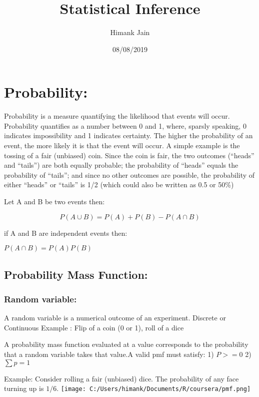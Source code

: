 \documentclass[]{article}
\title{Statistical Inference}
\author{Himank Jain}
\date{08/08/2019}
\begin{document}
\maketitle

\hypertarget{probability}{%
\section{Probability:}\label{probability}}

Probability is a measure quantifying the likelihood that events will
occur. Probability quantifies as a number between 0 and 1, where,
sparsly speaking, 0 indicates impossibility and 1 indicates certainty.
The higher the probability of an event, the more likely it is that the
event will occur. A simple example is the tossing of a fair (unbiased)
coin. Since the coin is fair, the two outcomes (``heads'' and ``tails'')
are both equally probable; the probability of ``heads'' equals the
probability of ``tails''; and since no other outcomes are possible, the
probability of either ``heads'' or ``tails'' is 1/2 (which could also be
written as 0.5 or 50\%)

Let A and B be two events then:

\[P(A \cup B)=P(A)+P(B)-P(A \cap B) \]

if A and B are independent events then:

\(P(A\cap B)=P(A)P(B)\)

\hypertarget{probability-mass-function}{%
\subsection{Probability Mass
Function:}\label{probability-mass-function}}

\hypertarget{random-variable}{%
\subsubsection{Random variable:}\label{random-variable}}

A random variable is a numerical outcome of an experiment. Discrete or
Continuous Example : Flip of a coin (0 or 1), roll of a dice

A probability mass function evaluated at a value corresponds to the
probability that a random variable takes that value.A valid pmf must
satisfy: 1) \(P >=0\) 2) \(\sum p=1\)

Example: Consider rolling a fair (unbiased) dice. The probability of any
face turning up is \(1/6\).
\texttt{[image: C:/Users/himank/Documents/R/coursera/pmf.png]}
\end{document}
